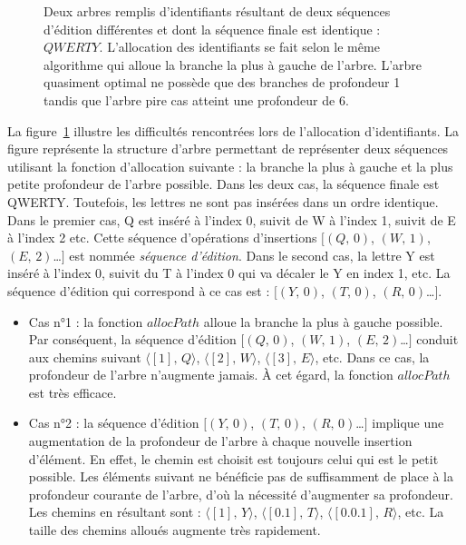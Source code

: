 \begin{figure}
  \centering
  \hspace{40pt}
  \caption{\label{fig:lseq:allocpathexample} Deux arbres remplis d'identifiants
    résultant de deux séquences d'édition différentes et dont la séquence finale
    est identique : $QWERTY$. L'allocation des identifiants se fait selon le
    même algorithme qui alloue la branche la plus à gauche de l'arbre. L'arbre
    quasiment optimal ne possède que des branches de profondeur 1 tandis que
    l'arbre pire cas atteint une profondeur de 6.}
\end{figure}

La figure~\ref{fig:lseq:allocpathexample} illustre les difficultés rencontrées lors
de l'allocation d'identifiants. La figure représente la structure d'arbre
permettant de représenter deux séquences utilisant la fonction d'allocation
suivante : la branche la plus à gauche et la plus petite profondeur de l'arbre
possible. Dans les deux cas, la séquence finale est QWERTY. Toutefois, les
lettres ne sont pas insérées dans un ordre identique. Dans le premier cas, Q est
inséré à l'index 0, suivit de W à l'index 1, suivit de E à l'index 2 etc. Cette
séquence d'opérations d'insertions $[(Q,\,0)$, $(W,\,1)$, $(E,\,2)$\ldots$]$ est
nommée \emph{séquence d'édition}. Dans le second cas, la lettre Y est inséré à
l'index 0, suivit du T à l'index 0 qui va décaler le Y en index 1, etc. La
séquence d'édition qui correspond à ce cas est : $[(Y,\,0)$, $(T,\,0)$,
$(R,\,0)$\ldots$]$.
\begin{itemize}
\item Cas n°1 : la fonction $allocPath$ alloue la branche la plus à gauche
  possible. Par conséquent, la séquence d'édition $[(Q,\,0)$, $(W,\,1)$,
  $(E,\,2)$\ldots$]$ conduit aux chemins suivant $\langle [1],\,Q\rangle$,
  $\langle [2],\, W \rangle$, $\langle [3],\, E\rangle$, etc. Dans ce cas, la
  profondeur de l'arbre n'augmente jamais. À cet égard, la fonction $allocPath$
  est très efficace.
\item Cas n°2 : la séquence d'édition $[(Y,\,0)$, $(T,\,0)$, $(R,\,0)$\ldots$]$
  implique une augmentation de la profondeur de l'arbre à chaque nouvelle
  insertion d'élément. En effet, le chemin est choisit est toujours celui qui
  est le petit possible. Les éléments suivant ne bénéficie pas de suffisamment de
  place à la profondeur courante de l'arbre, d'où la nécessité d'augmenter sa
  profondeur. Les chemins en résultant sont : $\langle [1],\, Y\rangle$,
  $\langle[0.1],\,T\rangle$, $\langle[0.0.1],\, R\rangle$, etc. La taille des
  chemins alloués augmente très rapidement.
\end{itemize}

